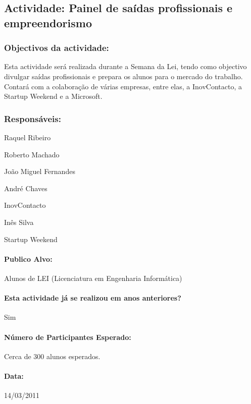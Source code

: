 \subsection{Actividade: Painel de saídas profissionais e empreendorismo} %

\subsubsection*{Objectivos da actividade:}
Esta actividade será realizada durante a Semana da Lei, tendo como objectivo divulgar saídas profissionais e prepara os alunos para o mercado do trabalho. Contará com a colaboração de várias empresas, entre elas, a InovContacto, a Startup Weekend e a Microsoft.

\subsubsection*{Responsáveis:}
\begin{itemizedash}
	\item{Raquel Ribeiro}
	\item{Roberto Machado}
	\item{João Miguel Fernandes}
	\item{André Chaves}
	\item{InovContacto}
	\item{Inês Silva}
	\item{Startup Weekend}
\end{itemizedash}

\paragraph{Publico Alvo: }
Alunos de LEI (Licenciatura em Engenharia Informática)

\paragraph{Esta actividade já se realizou em anos anteriores?}
Sim

\paragraph{Número de Participantes Esperado:}
Cerca de 300 alunos esperados.

\paragraph{Data:} 14/03/2011

